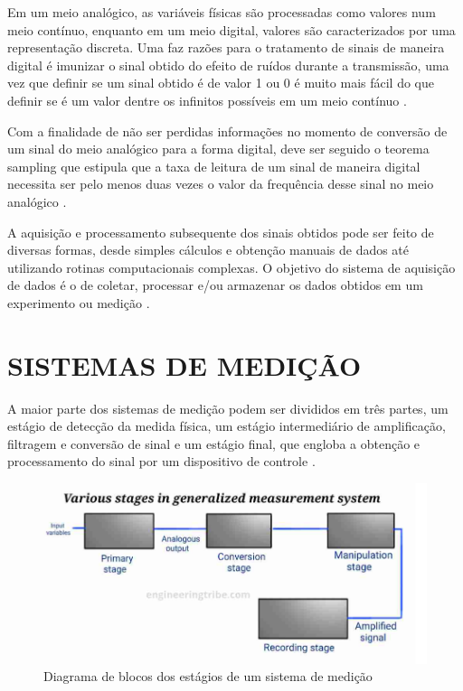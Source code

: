 Em um meio analógico, as variáveis físicas são processadas como valores num meio contínuo, enquanto em um meio digital, valores são caracterizados por uma representação discreta. Uma faz razões para o tratamento de sinais de maneira digital é imunizar o sinal obtido do efeito de ruídos durante a transmissão, uma vez que definir se um sinal obtido é de valor 1 ou 0 é muito mais fácil do que definir se é um valor dentre os infinitos possíveis em um meio contínuo \autocite{Hollman2011}.

Com a finalidade de não ser perdidas informações no momento de conversão de um sinal do meio analógico para a forma digital, deve ser seguido o teorema sampling que estipula que a taxa de leitura de um sinal de maneira digital necessita ser pelo menos duas vezes o valor da frequência desse sinal no meio analógico \autocite{Hollman2011}.

A aquisição e processamento subsequente dos sinais obtidos pode ser feito de diversas formas, desde simples cálculos e obtenção manuais de dados até utilizando  rotinas computacionais complexas. O objetivo do sistema de aquisição de dados é o de coletar, processar e/ou armazenar os dados obtidos em um experimento ou medição \autocite{Hollman2011}.

\section{SISTEMAS DE MEDIÇÃO}

A maior parte dos sistemas de medição podem ser divididos em três partes, um estágio de detecção da medida física, um estágio intermediário de amplificação, filtragem e conversão de sinal e um estágio final, que engloba a obtenção e processamento do sinal por um dispositivo de controle \autocite{Hollman2011}.

\begin{figure}[htb]
	\caption{\label{fig:1130} Diagrama de blocos dos estágios de um sistema de medição}
	\begin{center}
		\includegraphics[width=\textwidth]{pictures/1130.png}
	\end{center}
\end{figure}


